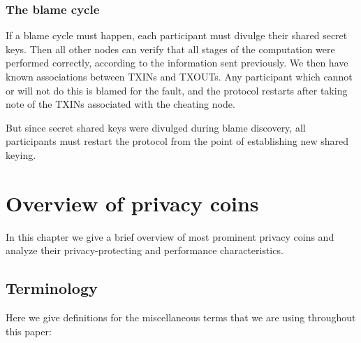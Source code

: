 \documentclass[8pt,fleqn,openany]{book}
\begin{document}
\subsection{The blame cycle} 
If a blame cycle must happen, each participant must divulge their shared secret keys. Then all other nodes can verify that all stages of the computation were performed correctly, according to the information sent previously. We then have known associations between TXINs and TXOUTs. Any participant which cannot or will not do this is blamed for the fault, and the protocol restarts after taking note of the TXINs associated with the cheating node.

But since secret shared keys were divulged during blame discovery, all participants must restart the protocol from the point of establishing new shared keying.

\chapter{Overview of privacy coins}\label{app:privacy-coins}

In this chapter we give a brief overview of most prominent privacy coins and analyze their privacy-protecting and performance characteristics.

\section{Terminology}
Here we give definitions for the miscellaneous terms that we are using throughout this paper:
\end{document}
